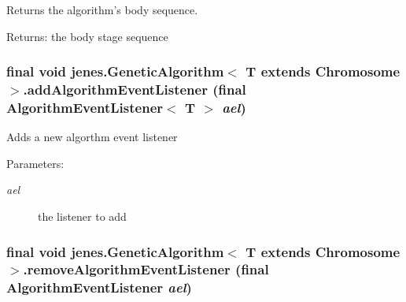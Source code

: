 Returns the algorithm's body sequence. 

\begin{Desc}
\item[Returns:]the body stage sequence \end{Desc}
\hypertarget{classjenes_1_1_genetic_algorithm_3_01_t_01extends_01_chromosome_01_4_168e2b37b5351108e62d8fb887e1fae4}{
\subsubsection[addAlgorithmEventListener]{\setlength{\rightskip}{0pt plus 5cm}final void jenes.GeneticAlgorithm$<$ T extends Chromosome $>$.addAlgorithmEventListener (final AlgorithmEventListener$<$ T $>$ {\em ael})}}
\label{classjenes_1_1_genetic_algorithm_3_01_t_01extends_01_chromosome_01_4_168e2b37b5351108e62d8fb887e1fae4}


Adds a new algorthm event listener 

\begin{Desc}
\item[Parameters:]
\begin{description}
\item[{\em ael}]the listener to add \end{description}
\end{Desc}
\hypertarget{classjenes_1_1_genetic_algorithm_3_01_t_01extends_01_chromosome_01_4_8cab61e04f54ed5abbda047815a1683d}{
\subsubsection[removeAlgorithmEventListener]{\setlength{\rightskip}{0pt plus 5cm}final void jenes.GeneticAlgorithm$<$ T extends Chromosome $>$.removeAlgorithmEventListener (final AlgorithmEventListener {\em ael})}}
\label{classjenes_1_1_genetic_algorithm_3_01_t_01extends_01_chromosome_01_4_8cab61e04f54ed5abbda047815a1683d}


